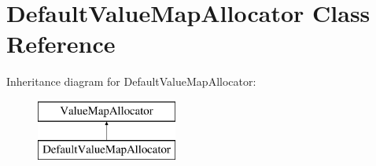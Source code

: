 \hypertarget{class_default_value_map_allocator}{\section{Default\-Value\-Map\-Allocator Class Reference}
\label{class_default_value_map_allocator}
}
Inheritance diagram for Default\-Value\-Map\-Allocator\-:\begin{figure}[H]
\begin{center}
\leavevmode
\includegraphics[height=2.000000cm]{class_default_value_map_allocator}
\end{center}
\end{figure}

